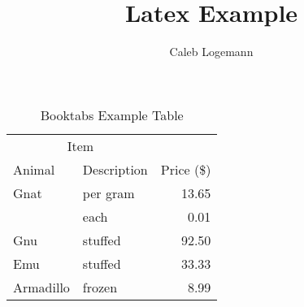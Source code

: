 \documentclass[12pt, oneside]{article}
\title{Latex Example}
\author{Caleb Logemann}
\begin{document}

    \begin{table}
        \centering
        \begin{tabular}{*{2}{l}r}
            \toprule

            \multicolumn{2}{c}{Item} \\

            \cmidrule(r){1-2}

            Animal    & Description & Price (\$) \\
            \midrule
            Gnat      & per gram    & 13.65      \\
                      & each        & 0.01       \\
            Gnu       & stuffed     & 92.50      \\
            Emu       & stuffed     & 33.33      \\
            Armadillo & frozen      & 8.99       \\

            \bottomrule
        \end{tabular}

        \caption{Booktabs Example Table}

        \label{tab:exampleTable}
    \end{table}
\end{document}
